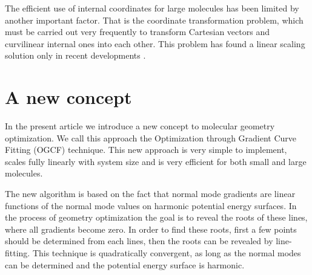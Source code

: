 \documentclass[prl,aps,twocolumn,showpacs,twocolumngrid,superbib]{revtex4}
\begin{document}
The efficient use of internal coordinates for large molecules has 
been limited by another important factor. That is the coordinate
transformation problem, which must be carried out very frequently
to transform Cartesian vectors and curvilinear internal ones into each
other. This problem has found a linear scaling solution   
only in recent developments 
\cite{paizs_coordtrf1,nemeth_coordtrf1,paizs_coordtrf2,nemeth_coordtrf2,billeter_coordtrf,andzelm_coordtrf,kudin_coordtrf}. 


\section{A new concept}
In the present article we introduce a new concept 
to molecular geometry optimization. We call this approach the
Optimization through Gradient Curve Fitting (OGCF) technique. 
This new approach is very simple
to implement, scales fully linearly with system size 
and is very efficient for both small and large molecules.

The new algorithm is based on the fact that
normal mode gradients are linear functions of the normal mode values 
on harmonic potential energy surfaces. 
In the process of geometry optimization the goal is to reveal the roots
of these lines, where all gradients become zero. In order to 
find these roots, first a few points should be determined from each
lines, then the roots can be revealed by line-fitting. This technique
is quadratically convergent, as long as the normal modes
can be determined and the potential energy surface is harmonic.
\end{document}
